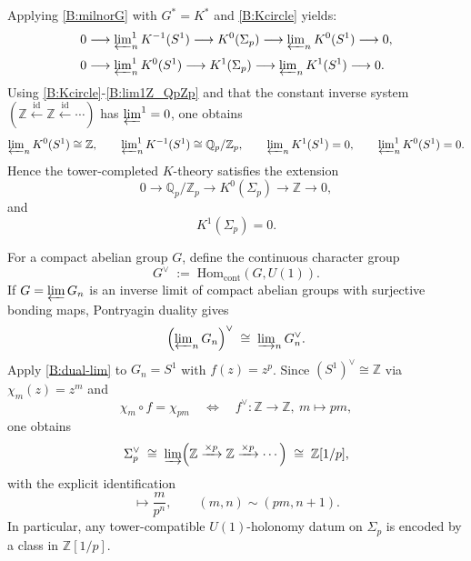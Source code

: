 \documentclass[11pt]{article}
\theoremstyle{remark}
\begin{document}
Applying \eqref{B:milnorG} with $G^\ast=K^\ast$ and \eqref{B:Kcircle} yields:
\begin{align}
0 &\longrightarrow \varprojlim\nolimits^{1}_{n}K^{-1}(S^{1})
\longrightarrow K^{0}(\Sigma_{p})
\longrightarrow \varprojlim\nolimits_{n}K^{0}(S^{1})
\longrightarrow 0,
\label{B:milnor0}\\[1mm]
0 &\longrightarrow \varprojlim\nolimits^{1}_{n}K^{0}(S^{1})
\longrightarrow K^{1}(\Sigma_{p})
\longrightarrow \varprojlim\nolimits_{n}K^{1}(S^{1})
\longrightarrow 0.
\label{B:milnor1}
\end{align}
Using \eqref{B:Kcircle}-\eqref{B:lim1Z_QpZp} and that the constant inverse system $(\mathbb{Z}\xleftarrow{\mathrm{id}}\mathbb{Z}\xleftarrow{\mathrm{id}}\cdots)$ has $\varprojlim^{1}=0$, one obtains
\begin{equation}
\varprojlim\nolimits_{n}K^{0}(S^{1})\cong \mathbb{Z},
\qquad
\varprojlim\nolimits^{1}_{n}K^{-1}(S^{1})\cong \mathbb{Q}_{p}/\mathbb{Z}_{p},
\qquad
\varprojlim\nolimits_{n}K^{1}(S^{1})=0,
\qquad
\varprojlim\nolimits^{1}_{n}K^{0}(S^{1})=0.
\label{B:limsK}
\end{equation}
Hence the tower-completed $K$-theory satisfies the extension
\begin{equation}
0 \longrightarrow \mathbb{Q}_{p}/\mathbb{Z}_{p}
\longrightarrow K^{0}(\Sigma_{p})
\longrightarrow \mathbb{Z}
\longrightarrow 0,
\label{B:K0ext}
\end{equation}
and
\begin{equation}
K^{1}(\Sigma_{p})=0.
\label{B:K1zero}
\end{equation}

For a compact abelian group $G$, define the continuous character group
\begin{equation}
G^{\vee} \;:=\; \mathrm{Hom}_{\mathrm{cont}}(G,U(1)).
\label{B:Pontryagin}
\end{equation}
If $G=\varprojlim G_n$ is an inverse limit of compact abelian groups with surjective bonding maps, Pontryagin duality gives
\begin{equation}
\Bigl(\varprojlim\nolimits_{n}G_n\Bigr)^{\vee}
\;\cong\;
\varinjlim\nolimits_{n} G_n^{\vee}.
\label{B:dual-lim}
\end{equation}
Apply \eqref{B:dual-lim} to $G_n=S^{1}$ with $f(z)=z^{p}$. Since $(S^{1})^{\vee}\cong\mathbb{Z}$ via $\chi_m(z)=z^{m}$ and
\begin{equation}
\chi_m\circ f=\chi_{pm}\quad\Longleftrightarrow\quad f^{\vee}:\mathbb{Z}\to\mathbb{Z},\ m\mapsto pm,
\label{B:dualmap}
\end{equation}
one obtains
\begin{equation}
\Sigma_{p}^{\vee}
\;\cong\;
\varinjlim\Bigl(\mathbb{Z}\xrightarrow{\times p}\mathbb{Z}\xrightarrow{\times p}\cdots\Bigr)
\;\cong\;
\mathbb{Z}[1/p],
\label{B:SigmaDual}
\end{equation}
with the explicit identification
\begin{equation}
[m,n]\longmapsto \frac{m}{p^{n}},\qquad (m,n)\sim(pm,n+1).
\label{B:Zlocid}
\end{equation}
In particular, any tower-compatible $U(1)$-holonomy datum on $\Sigma_p$ is encoded by a class in $\mathbb{Z}[1/p]$.
\end{document}
